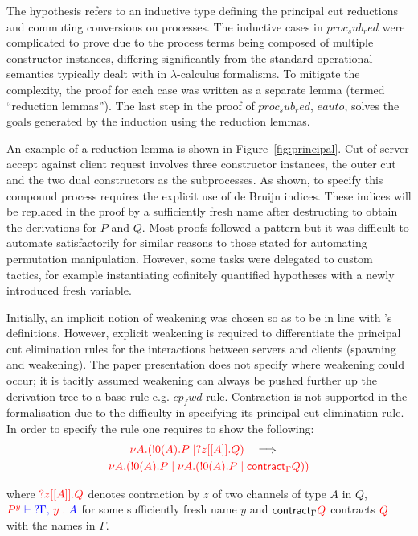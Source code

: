 

The  hypothesis refers to an inductive type defining the principal
cut reductions and commuting conversions on processes. The inductive cases in
\coqe$proc_sub_red$ were complicated to prove due to the process terms being
composed of multiple constructor instances, differing significantly from the
standard operational semantics typically dealt with in $\lambda$-calculus
formalisms. To mitigate the complexity, the proof for each case was written as
a separate lemma (termed ``reduction lemmas''). The last step in the proof of
\coqe$proc_sub_red$, \coqe$eauto$, solves the goals generated by the induction
using the reduction lemmas.

An example of a reduction lemma is shown in Figure~\ref{fig:principal}. Cut of
server accept against client request involves three constructor instances, the
outer cut and the two dual constructors as the subprocesses. As shown, to
specify this compound process requires the explicit use of de Bruijn
indices. These indices will be replaced in the proof by a sufficiently fresh
name after destructing  to obtain the derivations for \coqe$P$ and
\coqe$Q$. Most proofs followed a pattern but it was difficult to automate
satisfactorily for similar reasons to those stated for automating permutation
manipulation. However, some tasks were delegated to custom tactics, for
example instantiating cofinitely quantified hypotheses with a newly introduced
fresh variable.

Initially, an implicit notion of weakening was chosen so as to be in line with
\citeauthor{Wadler:2014}'s definitions. However, explicit weakening is
required to differentiate the principal cut elimination rules for the
interactions between servers and clients (spawning and weakening). The paper
presentation does not specify where weakening could occur; it is tacitly
assumed weakening can always be pushed further up the derivation tree to a
base rule e.g. \coqe$cp_fwd$ rule. Contraction is not supported in the
formalisation due to the difficulty in specifying its principal cut
elimination rule. In order to specify the rule one requires to show the
following:
\begin{gather*}
{\color{red}\nu A.(!0(A).P \mid ?z[[A]].Q)}
\quad \Longrightarrow \quad \\
{\color{red} \nu A.(!0(A).P \mid \nu A.(!0(A).P \mid \textsf{contract}_{\Gamma} Q))}
\end{gather*}

where ${\color{red} ?z[[A]].Q}$ denotes contraction by $z$ of two channels of type $A$
in $Q$, ${\color{red} P^y} {\color{blue} {} \vdash {}} {\color{blue} {?\Gamma} ,\, {\color{red} y:{}}A}$ for some
sufficiently fresh name $y$ and $\textsf{contract}_{\Gamma} {\color{red} Q}$ contracts
${\color{red} Q}$ with the names in $\Gamma$.

